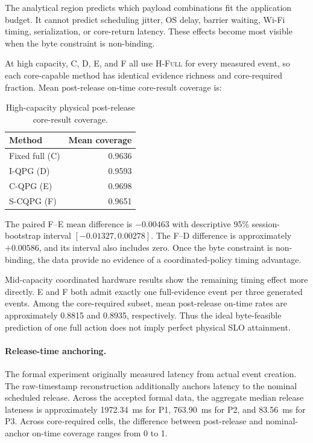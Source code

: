 \documentclass[10pt,journal]{IEEEtran}
\newcommand{\Hfull}{\textsc{H-Full}}
\newcommand{\IQPG}{\textsc{I-QPG}}
\newcommand{\CQPG}{\textsc{C-QPG}}
\newcommand{\SCQPG}{\textsc{S-CQPG}}
\begin{document}
The analytical region predicts which payload combinations fit the
application budget. It cannot predict scheduling jitter, OS delay,
barrier waiting, Wi-Fi timing, serialization, or core-return latency.
These effects become most visible when the byte constraint is
non-binding.

At high capacity, C, D, E, and F all use \Hfull{} for every measured
event, so each core-capable method has identical evidence richness and
core-required fraction. Mean post-release on-time core-result coverage
is:

\begin{table}[t]
\centering
\caption{High-capacity physical post-release core-result coverage.}
\label{tab:high}
\small
\begin{tabular}{@{}lr@{}}
\toprule
Method & Mean coverage \\
\midrule
Fixed full (C) & 0.9636 \\
\IQPG{} (D) & 0.9593 \\
\CQPG{} (E) & 0.9698 \\
\SCQPG{} (F) & 0.9651 \\
\bottomrule
\end{tabular}
\end{table}

The paired F--E mean difference is $-0.00463$ with descriptive
95\% session-bootstrap interval $[-0.01327,0.00278]$. The F--D
difference is approximately $+0.00586$, and its interval also includes
zero. Once the byte constraint is non-binding, the data provide no
evidence of a coordinated-policy timing advantage.

Mid-capacity coordinated hardware results show the remaining timing
effect more directly. E and F both admit exactly one full-evidence event
per three generated events. Among the core-required subset, mean
post-release on-time rates are approximately 0.8815 and 0.8935,
respectively. Thus the ideal byte-feasible prediction of one full action
does not imply perfect physical SLO attainment.

\paragraph{Release-time anchoring.}
The formal experiment originally measured latency from actual event
creation. The raw-timestamp reconstruction additionally anchors latency
to the nominal scheduled release. Across the accepted formal data, the
aggregate median release lateness is approximately 1972.34~ms for P1,
763.90~ms for P2, and 83.56~ms for P3. Across core-required cells, the
difference between post-release and nominal-anchor on-time coverage
ranges from 0 to 1.
\end{document}
